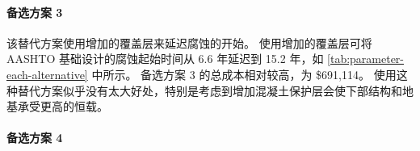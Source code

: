\paragraph*{备选方案 3}

该替代方案使用增加的覆盖层来延迟腐蚀的开始。 使用增加的覆盖层可将 AASHTO 基础设计的腐蚀起始时间从 6.6 年延迟到 15.2 年，如 \cref{tab:parameter-each-alternative} 中所示。 备选方案 3 的总成本相对较高，为 \$691,114。 使用这种替代方案似乎没有太大好处，特别是考虑到增加混凝土保护层会使下部结构和地基承受更高的恒载。


\paragraph*{备选方案 4}

